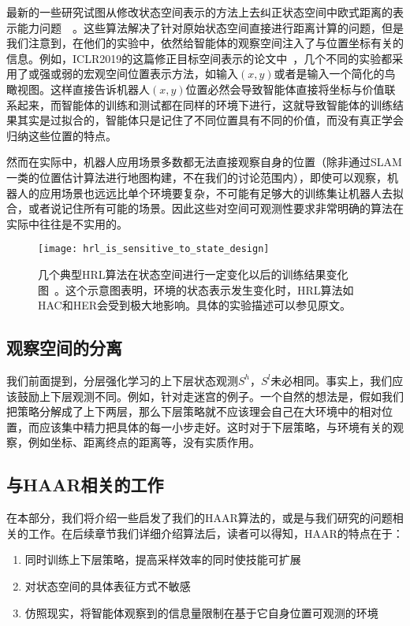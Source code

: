最新的一些研究试图从修改状态空间表示的方法上去纠正状态空间中欧式距离的表示能力问题~\cite{goal-conditioned}~\cite{goal_repr_learning}。这些算法解决了针对原始状态空间直接进行距离计算的问题，但是我们注意到，在他们的实验中，依然给智能体的观察空间注入了与位置坐标有关的信息。例如，ICLR2019的这篇修正目标空间表示的论文中~\cite{goal_repr_learning}，几个不同的实验都采用了或强或弱的宏观空间位置表示方法，如输入$(x, y)$或者是输入一个简化的鸟瞰视图。这样直接告诉机器人$(x, y)$位置必然会导致智能体直接将坐标与价值联系起来，而智能体的训练和测试都在同样的环境下进行，这就导致智能体的训练结果其实是过拟合的，智能体只是记住了不同位置具有不同的价值，而没有真正学会归纳这些位置的特点。

然而在实际中，机器人应用场景多数都无法直接观察自身的位置（除非通过SLAM一类的位置估计算法进行地图构建，不在我们的讨论范围内），即使可以观察，机器人的应用场景也远远比单个环境要复杂，不可能有足够大的训练集让机器人去拟合，或者说记住所有可能的场景。因此这些对空间可观测性要求非常明确的算法在实际中往往是不实用的。

\begin{figure}[h] %
  \centering
  \texttt{[image: hrl\_is\_sensitive\_to\_state\_design]}
  \caption{几个典型HRL算法在状态空间进行一定变化以后的训练结果变化图~\cite{sensitive_to_goal_space}。这个示意图表明，环境的状态表示发生变化时，HRL算法如HAC和HER会受到极大地影响。具体的实验描述可以参见原文。}
  \label{fig:sensitive_to_goal}
\end{figure}

\subsection{观察空间的分离}
我们前面提到，分层强化学习的上下层状态观测$S^h$，$S^l$未必相同。事实上，我们应该鼓励上下层观测不同。例如，针对走迷宫的例子。一个自然的想法是，假如我们把策略分解成了上下两层，那么下层策略就不应该理会自己在大环境中的相对位置，而应该集中精力把具体的每一小步走好。这时对于下层策略，与环境有关的观察，例如坐标、距离终点的距离等，没有实质作用。

\subsection{与HAAR相关的工作}
在本部分，我们将介绍一些启发了我们的HAAR算法的，或是与我们研究的问题相关的工作。在后续章节我们详细介绍算法后，读者可以得知，HAAR的特点在于：
\begin{enumerate}
  \item 同时训练上下层策略，提高采样效率的同时使技能可扩展
  \item 对状态空间的具体表征方式不敏感
  \item 仿照现实，将智能体观察到的信息量限制在基于它自身位置可观测的环境
\end{enumerate}

